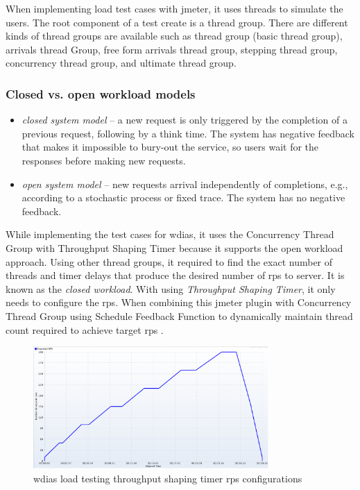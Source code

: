 When implementing load test cases with \acrshort{jmeter}, it uses threads to simulate the users. The root component of a test create is a thread group. There are different kinds of thread groups are available such as thread group (basic thread group), arrivals thread Group, free form arrivals thread group, stepping thread group, concurrency thread group, and ultimate thread group.


\subsubsection{Closed vs. open workload models}
\label{subse:closed_vs_open_workload}
\begin{itemize}
    \item \emph{closed system model} \cite{Haggett1998AnWales} -- a new request is only triggered by the completion of a previous request, following by a think time. The system has negative feedback that makes it impossible to bury-out the service, so users wait for the responses before making new requests.
    \item \emph{open system model} -- new requests arrival independently of completions, e.g., according to a stochastic process or fixed trace. The system has no negative feedback.
\end{itemize}
While implementing the test cases for \acrshort{wdias}, it uses the Concurrency Thread Group with Throughput Shaping Timer because it supports the open workload approach.
Using other thread groups, it required to find the exact number of threads and timer delays that produce the desired number of \acrfull{rps} to server. It is known as the \emph{closed workload}.
With using \emph{Throughput Shaping Timer}, it only needs to configure the \acrshort{rps}. When combining this \acrshort{jmeter} plugin with Concurrency Thread Group using Schedule Feedback Function to dynamically maintain thread count required to achieve target \acrshort{rps} \cite{KarunarathneGihanWdias/wdias-performance-test:JMeter.}.

\begin{figure}[htp]
    \centering
    \includegraphics[width=0.8\textwidth]{results/work_load/test_prod_throughtput_shaping_timer.png}
    \caption{\acrshort{wdias} load testing throughput shaping timer \acrshort{rps} configurations}
    \label{fi:test_prod_throughtput_shaping_timer}
\end{figure}

